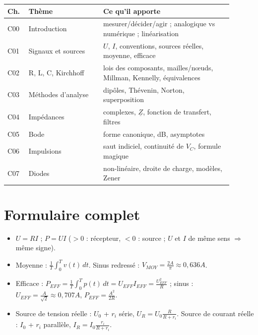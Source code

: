 \begin{center}
\renewcommand{\arraystretch}{1.3}
\begin{tabular}{p{0.08\linewidth}p{0.3\linewidth}p{0.52\linewidth}}
\textbf{Ch.} & \textbf{Thème} & \textbf{Ce qu'il apporte} \\ \hline
C00 & Introduction & mesurer/décider/agir ; analogique vs numérique ; linéarisation \\
C01 & Signaux et sources & $U$, $I$, conventions, sources réelles, moyenne, efficace \\
C02 & R, L, C, Kirchhoff & lois des composants, mailles/n\oe uds, Millman, Kennelly, équivalences \\
C03 & Méthodes d'analyse & dipôles, Thévenin, Norton, superposition \\
C04 & Impédances & complexes, $\underline Z$, fonction de transfert, filtres \\
C05 & Bode & forme canonique, dB, asymptotes \\
C06 & Impulsions & saut indiciel, continuité de $V_C$, formule magique \\
C07 & Diodes & non-linéaire, droite de charge, modèles, Zener \\
\end{tabular}
\end{center}

\section{Formulaire complet}

\begin{thmbox}[title={Signaux et puissance (C01)}]
\begin{itemize}
  \item $U = RI$ ; $P = UI$ ($>0$ : récepteur, $<0$ : source ; $U$ et $I$ de même sens
        $\Rightarrow$ même signe).
  \item Moyenne : $\frac1T\int_0^T v(t)\,dt$. Sinus redressé : $V_{MOY} = \frac{2A}{\pi}\approx0{,}636A$.
  \item Efficace : $P_{EFF} = \frac1T\int_0^T p(t)\,dt = U_{EFF}I_{EFF} = \frac{U_{EFF}^2}{R}$ ;
        sinus : $U_{EFF} = \frac{A}{\sqrt2}\approx0{,}707A$, $P_{EFF} = \frac{A^2}{2R}$.
  \item Source de tension réelle : $U_0$ + $r_i$ série, $U_R = U_0\frac{R}{R + r_i}$.
        Source de courant réelle : $I_0$ + $r_i$ parallèle, $I_R = I_0\frac{r_i}{R + r_i}$.
\end{itemize}
\end{thmbox}

